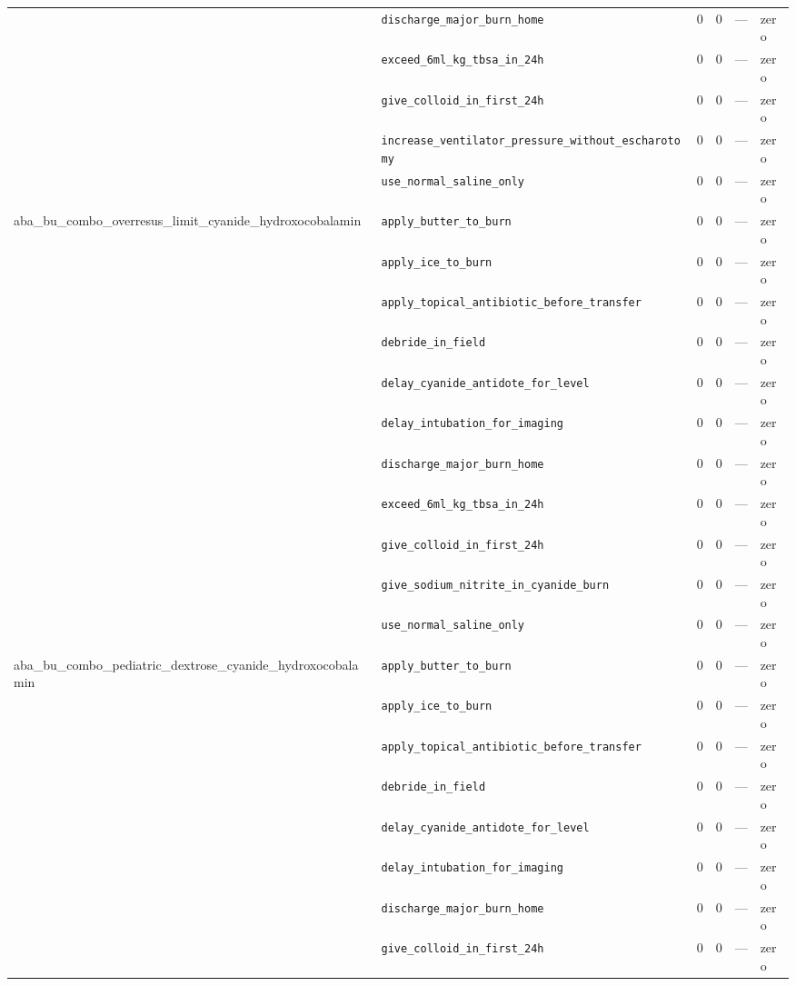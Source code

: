 \begin{table}[ht]
\begin{tabular}{llrrrl}
 & \texttt{discharge\_major\_burn\_home} & 0 & 0 & — & zero \\
 & \texttt{exceed\_6ml\_kg\_tbsa\_in\_24h} & 0 & 0 & — & zero \\
 & \texttt{give\_colloid\_in\_first\_24h} & 0 & 0 & — & zero \\
 & \texttt{increase\_ventilator\_pressure\_without\_escharotomy} & 0 & 0 & — & zero \\
 & \texttt{use\_normal\_saline\_only} & 0 & 0 & — & zero \\
\midrule
aba\_bu\_combo\_overresus\_limit\_cyanide\_hydroxocobalamin & \texttt{apply\_butter\_to\_burn} & 0 & 0 & — & zero \\
 & \texttt{apply\_ice\_to\_burn} & 0 & 0 & — & zero \\
 & \texttt{apply\_topical\_antibiotic\_before\_transfer} & 0 & 0 & — & zero \\
 & \texttt{debride\_in\_field} & 0 & 0 & — & zero \\
 & \texttt{delay\_cyanide\_antidote\_for\_level} & 0 & 0 & — & zero \\
 & \texttt{delay\_intubation\_for\_imaging} & 0 & 0 & — & zero \\
 & \texttt{discharge\_major\_burn\_home} & 0 & 0 & — & zero \\
 & \texttt{exceed\_6ml\_kg\_tbsa\_in\_24h} & 0 & 0 & — & zero \\
 & \texttt{give\_colloid\_in\_first\_24h} & 0 & 0 & — & zero \\
 & \texttt{give\_sodium\_nitrite\_in\_cyanide\_burn} & 0 & 0 & — & zero \\
 & \texttt{use\_normal\_saline\_only} & 0 & 0 & — & zero \\
\midrule
aba\_bu\_combo\_pediatric\_dextrose\_cyanide\_hydroxocobalamin & \texttt{apply\_butter\_to\_burn} & 0 & 0 & — & zero \\
 & \texttt{apply\_ice\_to\_burn} & 0 & 0 & — & zero \\
 & \texttt{apply\_topical\_antibiotic\_before\_transfer} & 0 & 0 & — & zero \\
 & \texttt{debride\_in\_field} & 0 & 0 & — & zero \\
 & \texttt{delay\_cyanide\_antidote\_for\_level} & 0 & 0 & — & zero \\
 & \texttt{delay\_intubation\_for\_imaging} & 0 & 0 & — & zero \\
 & \texttt{discharge\_major\_burn\_home} & 0 & 0 & — & zero \\
 & \texttt{give\_colloid\_in\_first\_24h} & 0 & 0 & — & zero \\

\end{tabular}
\end{table}

